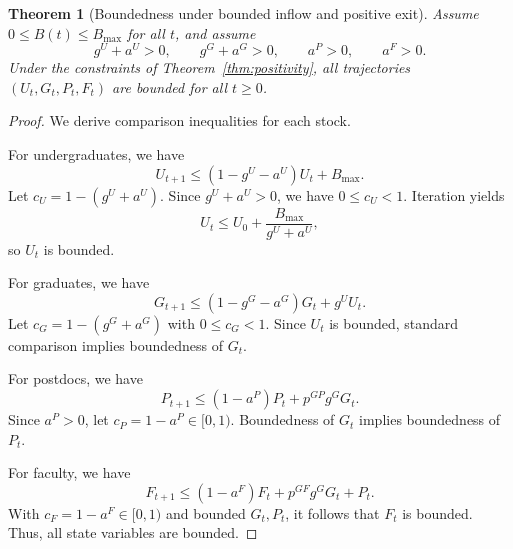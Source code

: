 \documentclass[10pt,a4paper]{amsart}
\newtheorem{theorem}{Theorem}
\begin{document}
\begin{theorem}[Boundedness under bounded inflow and positive exit]\label{thm:boundedness}
Assume \(0\leq B(t)\leq B_{\max}\) for all \(t\), and assume
\[
g^U+a^U>0,\qquad g^G+a^G>0,\qquad a^P>0,\qquad a^F>0.
\]
Under the constraints of Theorem~\ref{thm:positivity}, all trajectories \((U_t,G_t,P_t,F_t)\) are bounded for all \(t\geq 0\).
\end{theorem}

\begin{proof}
We derive comparison inequalities for each stock.

\noindent For undergraduates, we have
\[
U_{t+1} \leq (1-g^U-a^U)U_t + B_{\max}.
\]
Let \(c_U = 1-(g^U+a^U)\). Since \(g^U+a^U>0\), we have \(0\leq c_U<1\). Iteration yields
\[
U_t \leq U_0 + \frac{B_{\max}}{g^U+a^U},
\]
so \(U_t\) is bounded.

\noindent For graduates, we have
\[
G_{t+1} \leq (1-g^G-a^G)G_t + g^U U_t.
\]
Let \(c_G=1-(g^G+a^G)\) with \(0\leq c_G<1\). Since \(U_t\) is bounded, standard comparison implies boundedness of \(G_t\).

\noindent For postdocs, we have
\[
P_{t+1} \leq (1-a^P)P_t + p^{GP}g^G G_t.
\]
Since \(a^P>0\), let \(c_P=1-a^P\in[0,1)\). Boundedness of \(G_t\) implies boundedness of \(P_t\).

\noindent For faculty, we have
\[
F_{t+1} \leq (1-a^F)F_t + p^{GF}g^G G_t + P_t.
\]
With \(c_F=1-a^F\in[0,1)\) and bounded \(G_t,P_t\), it follows that \(F_t\) is bounded. Thus, all state variables are bounded.
\end{proof}
\end{document}
